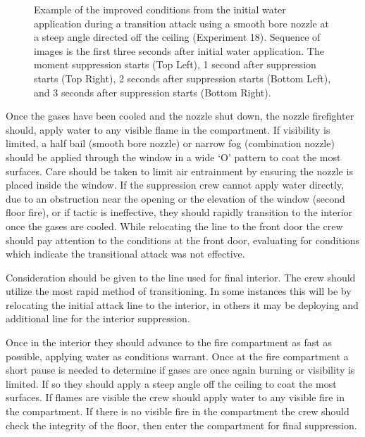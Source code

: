 \documentclass[12pt,oneside]{book}
\begin{document}
\begin{figure}[H]
\caption[Transitional Attack - Example of Positive Impact on Conditions]{Example of the improved conditions from the initial water application during a transition attack using a smooth bore nozzle at a steep angle directed off the ceiling (Experiment 18). Sequence of images is the first three seconds after initial water application. The moment suppression starts (Top Left), 1 second after suppression starts (Top Right), 2 seconds after suppression starts (Bottom Left), and 3 seconds after suppression starts (Bottom Right).}
\label{fig:TC_effective_initial_application}
\end{figure} 

Once the gases have been cooled and the nozzle shut down, the nozzle firefighter should, apply water to any visible flame in the compartment. If visibility is limited, a half bail (smooth bore nozzle) or narrow fog (combination nozzle) should be applied through the window in a wide `O' pattern to coat the most surfaces. Care should be taken to limit air entrainment by ensuring the nozzle is placed inside the window. If the suppression crew cannot apply water directly, due to an obstruction near the opening or the elevation of the window (second floor fire), or if tactic is ineffective, they should rapidly transition to the interior once the gases are cooled. While relocating the line to the front door the crew should pay attention to the conditions at the front door, evaluating for conditions which indicate the transitional attack was not effective. 

Consideration should be given to the line used for final interior. The crew should utilize the most rapid method of transitioning. In some instances this will be by relocating the initial attack line to the interior, in others it may be deploying and additional line for the interior suppression. 

Once in the interior they should advance to the fire compartment as fast as possible, applying water as conditions warrant. Once at the fire compartment a short pause is needed to determine if gases are once again burning or visibility is limited. If so they should apply a steep angle off the ceiling to coat the most surfaces. If flames are visible the crew should apply water to any visible fire in the compartment. If there is no visible fire in the compartment the crew should check the integrity of the floor, then enter the compartment for final suppression. 
\end{document}
